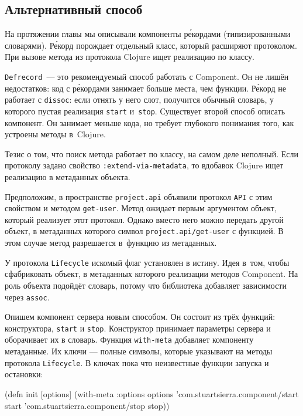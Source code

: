 \fi

\subsection{Альтернативный способ}

На протяжении главы мы описывали компоненты р\'{е}кордами (типизированными
словарями). Р\'{е}корд порождает отдельный класс, который расширяют
протоколом. При вызове метода из протокола Clojure ищет реализацию по классу.


\verb|Defrecord|~--- это рекомендуемый способ работать с Component. Он не лишён
недостатков: код с р\'{е}кордами занимает больше места, чем функции. Р\'{е}корд не
работает с \verb|dissoc|: если отнять у него слот, получится обычный словарь, у
которого пустая реализация \verb|start| и~\verb|stop|. Существует второй способ
описать компонент. Он занимает меньше кода, но требует глубокого понимания того,
как устроены методы в~Clojure.

Тезис о том, что поиск метода работает по классу, на самом деле неполный. Если
протоколу задано свойство \verb|:extend-via-metadata|, то вдобавок Clojure ищет
реализацию в метаданных объекта.

Предположим, в пространстве \verb|project.api| объявили протокол \verb|API| с
этим свойством и методом \verb|get-user|. Метод ожидает первым аргументом
объект, который реализует этот протокол. Однако вместо него можно передать
другой объект, в метаданных которого символ \verb|project.api/get-user| с
функцией. В этом случае метод разрешается в~функцию из метаданных.

У протокола \verb|Lifecycle| искомый флаг установлен в истину. Идея в~том, чтобы
сфабриковать объект, в метаданных которого реализации методов Component. На роль
объекта подойдёт словарь, потому что библиотека добавляет зависимости через
\verb|assoc|.

Опишем компонент сервера новым способом. Он состоит из трёх функций:
конструктора, \verb|start| и \verb|stop|. Конструктор принимает параметры
сервера и оборачивает их в словарь. Функция \verb|with-meta| добавляет компоненту
метаданные. Их ключи — полные символы, которые указывают на методы протокола
\verb|Lifecycle|. В ключах пока что неизвестные функции запуска и остановки:

\ifx\DEVICETYPE\MOBILE

\begin{english}
  \begin{clojure}
(defn init [options]
  (with-meta {:options options}
    {'com.stuartsierra.component/start
     start
     'com.stuartsierra.component/stop
     stop}))
  \end{clojure}
\end{english}

